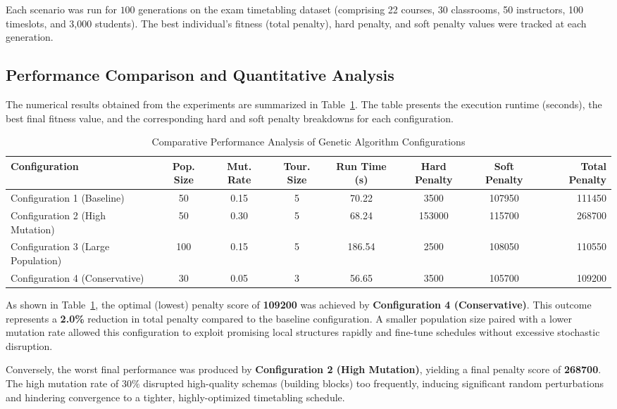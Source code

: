 Each scenario was run for $100$ generations on the exam timetabling dataset (comprising 22 courses, 30 classrooms, 50 instructors, 100 timeslots, and 3,000 students). The best individual's fitness (total penalty), hard penalty, and soft penalty values were tracked at each generation.

\subsection{Performance Comparison and Quantitative Analysis}
\label{subsec:performance_comparisons}

The numerical results obtained from the experiments are summarized in Table~\ref{tab:ga_experiments}. The table presents the execution runtime (seconds), the best final fitness value, and the corresponding hard and soft penalty breakdowns for each configuration.

\begin{table}[htbp]
\centering
\caption{Comparative Performance Analysis of Genetic Algorithm Configurations}
\label{tab:ga_experiments}
\begin{tabular}{lccccccr}
\hline
\textbf{Configuration} & \textbf{Pop. Size} & \textbf{Mut. Rate} & \textbf{Tour. Size} & \textbf{Run Time (s)} & \textbf{Hard Penalty} & \textbf{Soft Penalty} & \textbf{Total Penalty} \\ \hline
Configuration 1 (Baseline) & 50 & 0.15 & 5 & 70.22 & 3500 & 107950 & 111450 \\
Configuration 2 (High Mutation) & 50 & 0.30 & 5 & 68.24 & 153000 & 115700 & 268700 \\
Configuration 3 (Large Population) & 100 & 0.15 & 5 & 186.54 & 2500 & 108050 & 110550 \\
Configuration 4 (Conservative) & 30 & 0.05 & 3 & 56.65 & 3500 & 105700 & 109200 \\ \hline
\end{tabular}
\end{table}

As shown in Table~\ref{tab:ga_experiments}, the optimal (lowest) penalty score of \textbf{109200} was achieved by \textbf{Configuration 4 (Conservative)}. This outcome represents a \textbf{2.0\%} reduction in total penalty compared to the baseline configuration. A smaller population size paired with a lower mutation rate allowed this configuration to exploit promising local structures rapidly and fine-tune schedules without excessive stochastic disruption.

Conversely, the worst final performance was produced by \textbf{Configuration 2 (High Mutation)}, yielding a final penalty score of \textbf{268700}. The high mutation rate of $30\%$ disrupted high-quality schemas (building blocks) too frequently, inducing significant random perturbations and hindering convergence to a tighter, highly-optimized timetabling schedule.


